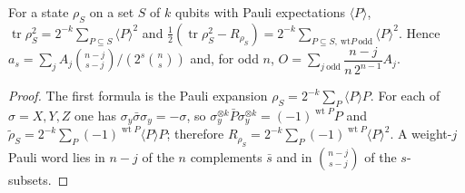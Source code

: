 \begin{lemma}\label{lem:odd-sector}
For a state $\rho_S$ on a set $S$ of $k$ qubits with Pauli expectations $\langle P\rangle$,
$\operatorname{tr}\rho_S^2=2^{-k}\sum_{P\subseteq S}\langle P\rangle^2$ and
$\tfrac12(\operatorname{tr}\rho_S^2-R_{\rho_S})=2^{-k}\sum_{P\subseteq S,\ \mathrm{wt}P\ \mathrm{odd}}\langle P\rangle^2$.
Hence $a_s=\sum_jA_j\binom{n-j}{s-j}/(2^s\binom ns)$ and, for odd $n$,
$O=\sum_{j\ \mathrm{odd}}\dfrac{n-j}{n\,2^{n-1}}A_j$.
\end{lemma}
\begin{proof}
The first formula is the Pauli expansion $\rho_S=2^{-k}\sum_P\langle P\rangle P$. For each of $\sigma=X,Y,Z$ one has $\sigma_y\bar\sigma\sigma_y=-\sigma$, so
$\sigma_y^{\otimes k}\bar P\sigma_y^{\otimes k}=(-1)^{\operatorname{wt}P}P$ and
$\tilde\rho_S=2^{-k}\sum_P(-1)^{\operatorname{wt}P}\langle P\rangle P$; therefore
$R_{\rho_S}=2^{-k}\sum_P(-1)^{\operatorname{wt}P}\langle P\rangle^2$. A weight-$j$ Pauli word lies in $n-j$ of the $n$ complements
$\bar s$ and in $\binom{n-j}{s-j}$ of the $s$-subsets.
\end{proof}

